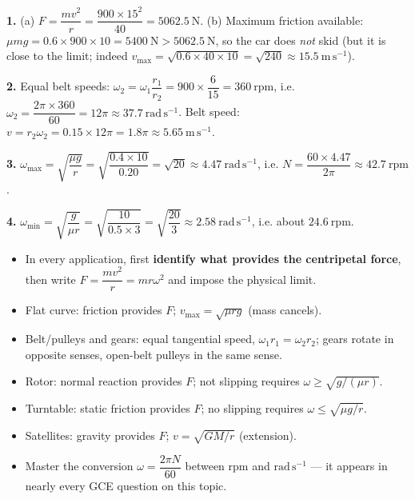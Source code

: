 \documentclass[11pt]{article}
\begin{document}
\begin{corrige}
\textbf{1.} (a) $F = \dfrac{mv^{2}}{r} = \dfrac{900 \times 15^{2}}{40} = 5062.5\ \mathrm{N}$. (b) Maximum friction available: $\mu mg = 0.6 \times 900 \times 10 = 5400\ \mathrm{N} > 5062.5\ \mathrm{N}$, so the car does \emph{not} skid (but it is close to the limit; indeed $v_{\max} = \sqrt{0.6 \times 40 \times 10} = \sqrt{240} \approx 15.5\ \mathrm{m\,s^{-1}}$).

\textbf{2.} Equal belt speeds: $\omega_2 = \omega_1 \dfrac{r_1}{r_2} = 900 \times \dfrac{6}{15} = 360\ \mathrm{rpm}$, i.e. $\omega_2 = \dfrac{2\pi \times 360}{60} = 12\pi \approx 37.7\ \mathrm{rad\,s^{-1}}$. Belt speed: $v = r_2\omega_2 = 0.15 \times 12\pi = 1.8\pi \approx 5.65\ \mathrm{m\,s^{-1}}$.

\textbf{3.} $\omega_{\max} = \sqrt{\dfrac{\mu g}{r}} = \sqrt{\dfrac{0.4 \times 10}{0.20}} = \sqrt{20} \approx 4.47\ \mathrm{rad\,s^{-1}}$, i.e. $N = \dfrac{60 \times 4.47}{2\pi} \approx 42.7\ \mathrm{rpm}$.

\textbf{4.} $\omega_{\min} = \sqrt{\dfrac{g}{\mu r}} = \sqrt{\dfrac{10}{0.5 \times 3}} = \sqrt{\dfrac{20}{3}} \approx 2.58\ \mathrm{rad\,s^{-1}}$, i.e. about $24.6\ \mathrm{rpm}$.
\end{corrige}

\begin{aretenir}
\begin{itemize}
\item In every application, first \textbf{identify what provides the centripetal force}, then write $F = \dfrac{mv^{2}}{r} = mr\omega^{2}$ and impose the physical limit.
\item Flat curve: friction provides $F$; $v_{\max} = \sqrt{\mu r g}$ (mass cancels).
\item Belt/pulleys and gears: equal tangential speed, $\omega_1 r_1 = \omega_2 r_2$; gears rotate in opposite senses, open-belt pulleys in the same sense.
\item Rotor: normal reaction provides $F$; not slipping requires $\omega \ge \sqrt{g/(\mu r)}$.
\item Turntable: static friction provides $F$; no slipping requires $\omega \le \sqrt{\mu g / r}$.
\item Satellites: gravity provides $F$; $v = \sqrt{GM/r}$ (extension).
\item Master the conversion $\omega = \dfrac{2\pi N}{60}$ between rpm and $\mathrm{rad\,s^{-1}}$ — it appears in nearly every GCE question on this topic.
\end{itemize}
\end{aretenir}
\end{document}
